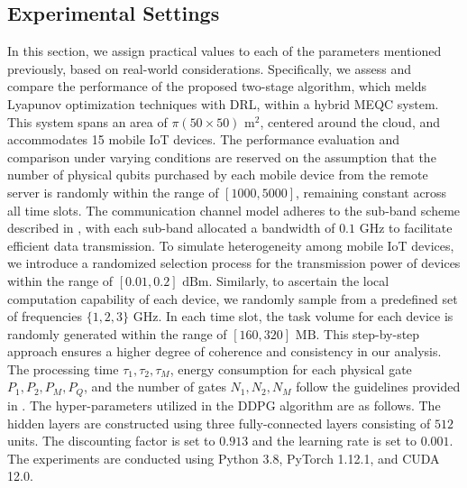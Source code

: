 \documentclass[journal]{IEEEtran}
\begin{document}
\subsection{Experimental Settings}
In this section, we assign practical values to each of the parameters mentioned previously, based on real-world considerations. Specifically, we assess and compare the performance of the proposed two-stage algorithm, which melds Lyapunov optimization techniques with DRL, within a hybrid MEQC system. This system spans an area of $\pi(50\times50)\text{~m}^2$, centered around the cloud, and accommodates 15 mobile IoT devices.
The performance evaluation and comparison under varying conditions are reserved on the assumption that the number of physical qubits purchased by each mobile device from the remote server is randomly within the range of $[1000, 5000]$, remaining constant across all time slots. The communication channel model adheres to the sub-band scheme described in \cite{cheng2020vehicular,wang2021general}, with each sub-band allocated a bandwidth of $0.1\text{~GHz}$ to facilitate efficient data transmission.
To simulate heterogeneity among mobile IoT devices, we introduce a randomized selection process for the transmission power of devices within the range of $[0.01, 0.2]\text{~dBm}$.
Similarly, to ascertain the local computation capability of each device, we randomly sample from a predefined set of frequencies $\{1, 2, 3\}\text{~GHz}$. In each time slot, the task volume for each device is randomly generated within the range of $[160, 320]\text{~MB}$. This step-by-step approach ensures a higher degree of coherence and consistency in our analysis.
The processing time $\tau_1, \tau_2, \tau_M$, energy consumption for each physical gate $P_1, P_2, P_M, P_Q$, and the number of gates $N_1, N_2, N_M$ follow the guidelines provided in \cite{ngoenriang2022optimal}.
The hyper-parameters utilized in the DDPG algorithm are as follows.
The hidden layers are constructed using three fully-connected layers consisting of $512$ units. The discounting factor is set to $0.913$ and the learning rate is set to $0.001$. The experiments are conducted using Python 3.8, PyTorch 1.12.1, and CUDA 12.0.
\end{document}
